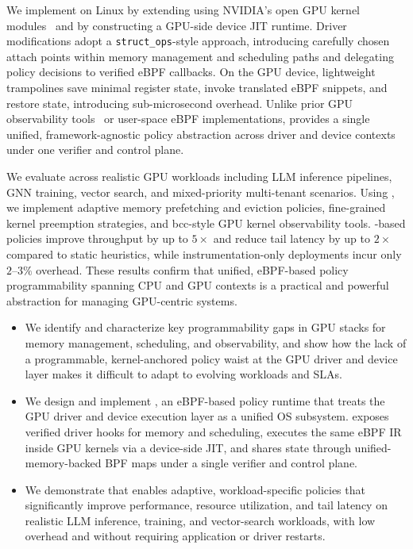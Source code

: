 We implement \sys on Linux by extending \sysdriver using NVIDIA's open GPU kernel modules~\cite{} and by constructing a GPU-side device JIT runtime. Driver modifications adopt a \texttt{struct\_ops}-style approach, introducing carefully chosen attach points within memory management and scheduling paths and delegating policy decisions to verified eBPF callbacks. On the GPU device, lightweight trampolines save minimal register state, invoke translated eBPF snippets, and restore state, introducing sub-microsecond overhead. Unlike prior GPU observability tools~\cite{cupti,villa2019nvbit,neutrino,egpu} or user-space eBPF implementations, \sys provides a single unified, framework-agnostic policy abstraction across driver and device contexts under one verifier and control plane.

We evaluate \sys across realistic GPU workloads including LLM inference pipelines, GNN training, vector search, and mixed-priority multi-tenant scenarios. Using \sys, we implement adaptive memory prefetching and eviction policies, fine-grained kernel preemption strategies, and bcc-style GPU kernel observability tools. \sys-based policies improve throughput by up to $5\times$ and reduce tail latency by up to $2\times$ compared to static heuristics, while instrumentation-only deployments incur only $2$–$3\%$ overhead. These results confirm that unified, eBPF-based policy programmability spanning CPU and GPU contexts is a practical and powerful abstraction for managing GPU-centric systems.

\begin{itemize}[leftmargin=*,itemsep=0pt]
  \item We identify and characterize key programmability gaps in GPU stacks for memory management, scheduling, and observability, and show how the lack of a programmable, kernel-anchored policy waist at the GPU driver and device layer makes it difficult to adapt to evolving workloads and SLAs.
  \item We design and implement \sys, an eBPF-based policy runtime that treats the GPU driver and device execution layer as a unified OS subsystem. \sys exposes verified driver hooks for memory and scheduling, executes the same eBPF IR inside GPU kernels via a device-side JIT, and shares state through unified-memory-backed BPF maps under a single verifier and control plane.
  \item We demonstrate that \sys enables adaptive, workload-specific policies that significantly improve performance, resource utilization, and tail latency on realistic LLM inference, training, and vector-search workloads, with low overhead and without requiring application or driver restarts.
\end{itemize}